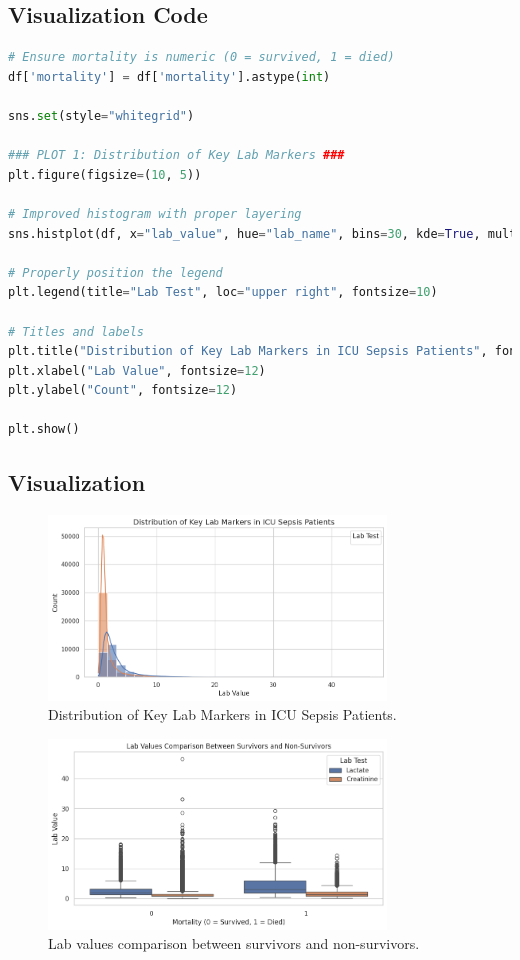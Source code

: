 \documentclass[a4paper,10pt]{article}
\begin{document}
\subsection{Visualization Code}
\begin{lstlisting}[language=Python]
# Ensure mortality is numeric (0 = survived, 1 = died)
df['mortality'] = df['mortality'].astype(int)

sns.set(style="whitegrid")

### PLOT 1: Distribution of Key Lab Markers ###
plt.figure(figsize=(10, 5))

# Improved histogram with proper layering
sns.histplot(df, x="lab_value", hue="lab_name", bins=30, kde=True, multiple="layer", alpha=0.6)

# Properly position the legend
plt.legend(title="Lab Test", loc="upper right", fontsize=10)

# Titles and labels
plt.title("Distribution of Key Lab Markers in ICU Sepsis Patients", fontsize=14)
plt.xlabel("Lab Value", fontsize=12)
plt.ylabel("Count", fontsize=12)

plt.show()
\end{lstlisting}

\subsection{Visualization}

\begin{figure}[h]
    \centering
    \includegraphics[width=0.8\textwidth]{figure4a.png}
    \caption{Distribution of Key Lab Markers in ICU Sepsis Patients.}
    \label{fig:lab_distribution}
\end{figure}

\begin{figure}[H]
    \centering
    \includegraphics[width=0.8\textwidth]{figure4b.png}
    \caption{Lab values comparison between survivors and non-survivors.}
    \label{fig:lab_comparison}
\end{figure}
\end{document}
